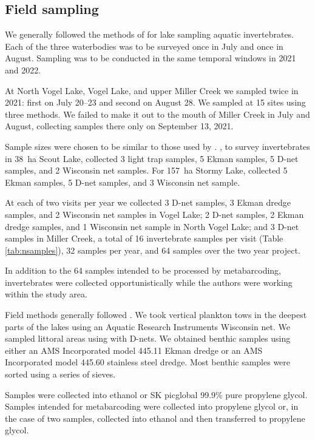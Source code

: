 \begin{multicols}{2}
\subsection{Field sampling}

We generally followed the methods of \citet{Massengill2014, Massengill2017} for lake sampling aquatic invertebrates. Each of the three waterbodies was to be surveyed once in July and once in August. Sampling was to be conducted in the same temporal windows in 2021 and 2022.

At North Vogel Lake, Vogel Lake, and upper Miller Creek we sampled twice in 2021: first on July 20--23 and second on August 28. We sampled at 15 sites using three methods. We failed to make it out to the mouth of Miller Creek in July and August, collecting samples there only on September 13, 2021. 

Sample sizes were chosen to be similar to those used by \citet{Massengill2014, Massengill2017}. \citet{Massengill2014}, to survey invertebrates in 38~ha Scout Lake, collected 3 light trap samples, 5 Ekman samples, 5 D-net samples, and 2 Wisconsin net samples. For 157~ha Stormy Lake, \citet{Massengill2014, Massengill2017} collected 5 Ekman samples, 5 D-net samples, and 3 Wisconsin net sample.



At each of two visits per year we collected 3 D-net samples, 3 Ekman dredge samples, and 2 Wisconsin net samples in Vogel Lake; 2 D-net samples, 2 Ekman dredge samples, and 1 Wisconsin net sample in North Vogel Lake; and 3 D-net samples in Miller Creek, a total of 16 invertebrate samples per visit (Table \ref{tab:nsamples}), 32 samples per year, and 64 samples over the two year project.

In addition to the 64 samples intended to be processed by metabarcoding, invertebrates were collected opportunistically while the authors were working within the study area.

Field methods generally followed \citet{Massengill2014, Massengill2017}. We took vertical plankton tows in the deepest parts of the lakes using an Aquatic Research Instruments Wisconsin net. We sampled littoral areas using with D-nets. We obtained benthic samples using either an AMS Incorporated model 445.11 Ekman dredge or an AMS Incorporated model 445.60  stainless steel dredge. Most benthic samples were sorted using a series of sieves.

Samples were collected into ethanol or SK picglobal 99.9\% pure propylene glycol. Samples intended for metabarcoding were collected into propylene glycol or, in the case of two samples, collected into ethanol and then transferred to propylene glycol.


\end{multicols}
